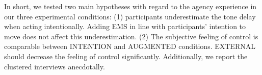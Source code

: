 In short, we tested two main hypotheses with regard to the agency experience in our three experimental conditions: (1) participants underestimate the tone delay when acting intentionally. Adding EMS in line with participants' intention to move does not affect this underestimation. (2) The subjective feeling of control is comparable between INTENTION and AUGMENTED conditions. EXTERNAL should decrease the feeling of control significantly. Additionally, we report the clustered interviews anecdotally.

